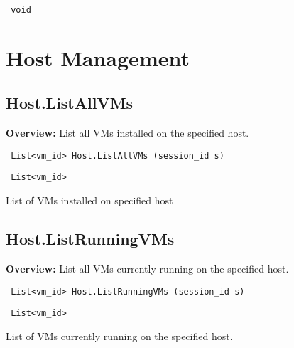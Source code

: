 \vspace{0.3cm}

{\tt 
void
}



\vspace{0.3cm}
\vspace{0.3cm}
\vspace{0.3cm}



\newpage\section{Host Management}

\subsection{Host.ListAllVMs}

{\bf Overview:} 
List all VMs installed on the specified host.

\begin{verbatim} List<vm_id> Host.ListAllVMs (session_id s)\end{verbatim}


\vspace{0.3cm}

{\tt 
List<vm\_id>
}


List of VMs installed on specified host
\vspace{0.3cm}
\vspace{0.3cm}
\vspace{0.3cm}

\subsection{Host.ListRunningVMs}

{\bf Overview:} 
List all VMs currently running on the specified host.

\begin{verbatim} List<vm_id> Host.ListRunningVMs (session_id s)\end{verbatim}


\vspace{0.3cm}

{\tt 
List<vm\_id>
}


List of VMs currently running on the specified host.
\vspace{0.3cm}
\vspace{0.3cm}
\vspace{0.3cm}

